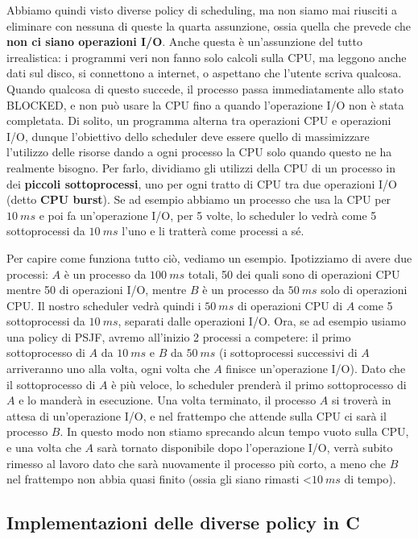 \documentclass[11pt, a4paper, titlepage, oneside]{scrbook}
\begin{document}
Abbiamo quindi visto diverse policy di scheduling, ma non siamo mai riusciti a eliminare con nessuna di queste la quarta assunzione, ossia quella che prevede che \textbf{non ci siano operazioni I/O}. Anche questa è un'assunzione del tutto irrealistica: i programmi veri non fanno solo calcoli sulla CPU, ma leggono anche dati sul disco, si connettono a internet, o aspettano che l'utente scriva qualcosa. Quando qualcosa di questo succede, il processo passa immediatamente allo stato BLOCKED, e non può usare la CPU fino a quando l'operazione I/O non è stata completata. Di solito, un programma alterna tra operazioni CPU e operazioni I/O, dunque l'obiettivo dello scheduler deve essere quello di massimizzare l'utilizzo delle risorse dando a ogni processo la CPU solo quando questo ne ha realmente bisogno. Per farlo, dividiamo gli utilizzi della CPU di un processo in dei \textbf{piccoli sottoprocessi}, uno per ogni tratto di CPU tra due operazioni I/O (detto \textbf{CPU burst}). Se ad esempio abbiamo un processo che usa la CPU per $\SI{10}{ms}$ e poi fa un'operazione I/O, per 5 volte, lo scheduler lo vedrà come 5 sottoprocessi da $\SI{10}{ms}$ l'uno e li tratterà come processi a sé. 

Per capire come funziona tutto ciò, vediamo un esempio. Ipotizziamo di avere due processi: $A$ è un processo da $\SI{100}{ms}$ totali, 50 dei quali sono di operazioni CPU mentre 50 di operazioni I/O, mentre $B$ è un processo da $\SI{50}{ms}$ solo di operazioni CPU. Il nostro scheduler vedrà quindi i $\SI{50}{ms}$ di operazioni CPU di $A$ come 5 sottoprocessi da $\SI{10}{ms}$, separati dalle operazioni I/O. Ora, se ad esempio usiamo una policy di PSJF, avremo all'inizio 2 processi a competere: il primo sottoprocesso di $A$ da $\SI{10}{ms}$ e $B$ da $\SI{50}{ms}$ (i sottoprocessi successivi di $A$ arriveranno uno alla volta, ogni volta che $A$ finisce un'operazione I/O). Dato che il sottoprocesso di $A$ è più veloce, lo scheduler prenderà il primo sottoprocesso di $A$ e lo manderà in esecuzione. Una volta terminato, il processo $A$ si troverà in attesa di un'operazione I/O, e nel frattempo che attende sulla CPU ci sarà il processo $B$. In questo modo non stiamo sprecando alcun tempo vuoto sulla CPU, e una volta che $A$ sarà tornato disponibile dopo l'operazione I/O, verrà subito rimesso al lavoro dato che sarà nuovamente il processo più corto, a meno che $B$ nel frattempo non abbia quasi finito (ossia gli siano rimasti <$\SI{10}{ms}$ di tempo).

\subsection{Implementazioni delle diverse policy in C}
\end{document}
